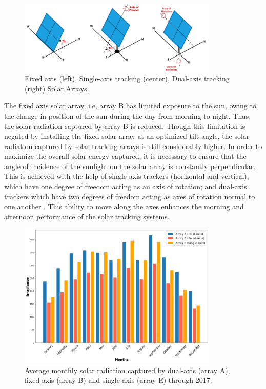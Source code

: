 \begin{figure}[ht]
    \begin{center}
    	\includegraphics[width=0.85\textwidth]{chapter3/fig_pyranometers.png}
    	\caption[Fixed axis, Single-axis tracking, Dual-axis tracking Solar Arrays]{Fixed axis (left), Single-axis tracking (center), Dual-axis tracking (right) Solar Arrays.}
    	\label{fig:fig_pyranometers}
    \end{center}
\end{figure}

The fixed axis solar array, i.e, array B has limited exposure to the sun, owing to the change in position of the sun during the day from morning to night. Thus, the solar radiation captured by array B is reduced. Though this limitation is negated by installing the fixed solar array at an optimized tilt angle, the solar radiation captured by solar tracking arrays is still considerably higher. In order to maximize the overall solar energy captured, it is necessary to ensure that the angle of incidence of the sunlight on the solar array is constantly perpendicular. This is achieved with the help of single-axis trackers (horizontal and vertical), which have one degree of freedom acting as an axis of rotation; and dual-axis trackers which have two degrees of freedom acting as axes of rotation normal to one another \cite{irradiance_solartracker}. This ability to move along the axes enhances the morning and afternoon performance of the solar tracking systems.

\begin{figure}[ht]
    \begin{center}
    	\includegraphics[width=0.85\textwidth]{chapter3/fig_average_irradiance.png}
    	\caption[Average monthly solar radiation captured by arrays A, B and E through 2017.]{Average monthly solar radiation captured by dual-axis (array A), fixed-axis (array B) and single-axis (array E) through 2017.}
    	\label{fig:fig_average_irradiance}
    \end{center}
\end{figure}

